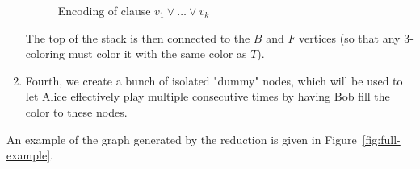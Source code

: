 \documentclass{article}
\begin{document}
\begin{enumerate}
\begin{figure}[H]
		      \caption{Encoding of clause $v_1 \lor \ldots \lor v_k$}
		      \label{fig:clause-encoding}
	      \end{figure}

	      The top of the stack is then connected to the $B$ and $F$ vertices (so that any 3-coloring must color it with the same color as $T$).

	\item Fourth, we create a bunch of isolated "dummy" nodes, which will be used to let Alice effectively play multiple consecutive times by having Bob fill the color to these nodes.
\end{enumerate}

An example of the graph generated by the reduction is given in Figure~\ref{fig:full-example}.
\end{document}
